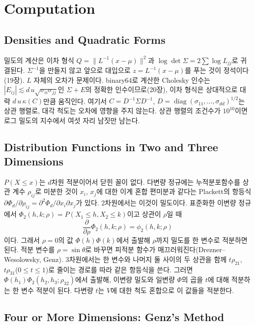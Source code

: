 \section{Computation}
\label{sec:mv-computation}

\subsection{Densities and Quadratic Forms}

밀도의 계산은 이차 형식 $Q=\|L^{-1}(x-\mu)\|^2$과 $\log\det\Sigma=2\sum\log L_{jj}$로 귀결된다. $\Sigma^{-1}$을 만들지 않고 앞으로 대입으로 $z=L^{-1}(x-\mu)$를 푸는 것이 정석이다(19장). $L$ 자체의 오차가 문제이다. binary64로 계산한 Cholesky 인수는 $|E_{ij}|\lesssim d\,u\sqrt{\sigma_{ii}\sigma_{jj}}$인 $\Sigma+E$의 정확한 인수이므로(20장), 이차 형식은 상대적으로 대략 $d\,u\,\kappa(C)$만큼 움직인다. 여기서 $C=D^{-1}\Sigma D^{-1}$, $D=\operatorname{diag}(\sigma_{11},\dots,\sigma_{dd})^{1/2}$는 상관 행렬로, 대각 척도는 오차에 영향을 주지 않는다. 상관 행렬의 조건수가 $10^{10}$이면 로그 밀도의 지수에서 여섯 자리 남짓만 남는다.

\subsection{Distribution Functions in Two and Three Dimensions}

$P(X\le x)$는 $d$차원 적분이어서 닫힌 꼴이 없다. 다변량 정규에는 누적분포함수를 상관 계수 $\rho_{ij}$로 미분한 것이 $x_i$, $x_j$에 대한 이계 혼합 편미분과 같다는 Plackett의 항등식 $\partial\Phi_d/\partial\rho_{ij}=\partial^2\Phi_d/\partial x_i\partial x_j$가 있다\cite{plackett1954}. 2차원에서는 이것이 밀도이다. 표준화한 이변량 정규에서 $\Phi_2(h,k;\rho)=P(X_1\le h,X_2\le k)$이고 상관이 $\rho$일 때
\[
\frac{\partial}{\partial\rho}\Phi_2(h,k;\rho)=\phi_2(h,k;\rho)
\]
이다. 그래서 $\rho=0$의 값 $\Phi(h)\Phi(k)$에서 출발해 $\rho$까지 밀도를 한 변수로 적분하면 된다. 적분 변수를 $\rho=\sin\theta$로 바꾸면 피적분 함수가 매끄러워진다(Drezner--Wesolowsky\cite{drezner1990}, Genz\cite{genz2004}). 3차원에서는 한 변수와 나머지 둘 사이의 두 상관을 함께 $t\rho_{21}$, $t\rho_{31}$($0\le t\le1$)로 줄이는 경로를 따라 같은 항등식을 쓴다. 그러면 $\Phi(h_1)\Phi_2(h_2,h_3;\rho_{32})$에서 출발해, 이변량 밀도와 일변량 $\Phi$의 곱을 $t$에 대해 적분하는 한 변수 적분이 된다. 다변량 $t$는 $V$에 대한 척도 혼합으로 이 값들을 적분한다.

\subsection{Four or More Dimensions: Genz's Method}

